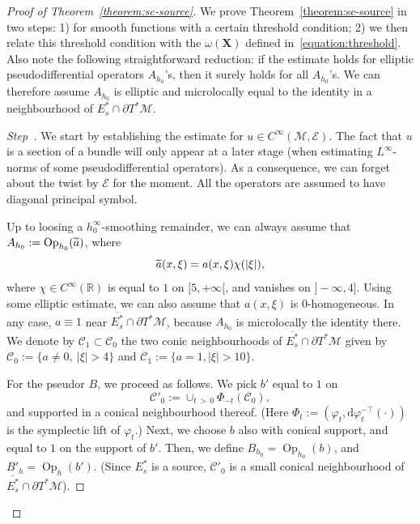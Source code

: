 \documentclass[10pt]{amsart}
\theoremstyle{definition}\newtheorem{defi}[theo]{Definition}\newtheorem{rema}[theo]{Remark}\newtheorem{exam}[theo]{Example}\newtheorem{exem}[theo]{Example}\newtheorem{nota}[theo]{Notation}
\newcommand{\R}{\mathbb{R}}
\newcommand{\X}{\mathbf{X}}
\newcommand{\M}{\mathcal{M}}
\newcommand{\E}{\mathcal{E}}
\newcommand{\clC}{\mathcal{C}}
\newcommand{\dd}{\mathrm{d}}
\DeclareMathOperator{\Op}{Op}
\newcounter{stepcount}
\newenvironment{step}{\refstepcounter{stepcount}\begin{proof}[Step~\thestepcount]}{\let\qed\relax\end{proof}}
\let\oldtilde\tilde
\renewcommand*{\tilde}[1]{\mathchoice{\widetilde{#1}}{\widetilde{#1}}{\oldtilde{#1}}{\oldtilde{#1}}}
\begin{document}
\begin{proof}[Proof of Theorem~\ref{theorem:sc-source}] We prove Theorem~\ref{theorem:sc-source} in two steps: 1) for smooth functions with a certain threshold condition; 2) we then relate this threshold condition with the $\omega(\X)$ defined in~\eqref{equation:threshold}. Also note the following straightforward reduction: if the estimate holds for elliptic pseudodifferential operators $A_{h_0}$'s, then it surely holds for all $A_{h_0}$'s. We can therefore assume $A_{h_0}$ is elliptic and microlocally equal to the identity in a neighbourhood of $E_s^* \cap \partial T^*\M$.

\begin{step}
We start by establishing the estimate for $u\in C^\infty(\M,\E)$. The fact that $u$ is a section of a bundle will only appear at a later stage (when estimating $L^\infty$-norms of some pseudodifferential operators). As a consequence, we can forget about the twist by $\E$ for the moment. All the operators are assumed to have diagonal principal symbol.

Up to loosing a $h_0^\infty$-smoothing remainder, we can always assume that $A_{h_0}:=\Op_{h_0}(\tilde{a})$, where
\[
\tilde{a}(x,\xi) = a(x,\xi) \chi(|\xi|),
\]
where $\chi\in C^\infty(\R)$ is equal to $1$ on $[5,+\infty[$, and vanishes on $]-\infty, 4]$. Using some elliptic estimate, we can also assume that $a(x,\xi)$ is $0$-homogeneous. In any case, $a \equiv 1$ near $\overline{E^*_s}\cap \partial T^*\M$, because $A_{h_0}$ is microlocally the identity there. We denote by $\clC_1 \subset \clC_0$ the two conic neighbourhoods of $\overline{E^\ast_s}\cap \partial T^\ast \M$ given by $\clC_0:=\{ a \neq 0,\ |\xi|>4\}$ and $\clC_1:=\{ a = 1,|\xi|>10\}$.

For the pseudor $B$, we proceed as follows. We pick $b'$ equal to $1$ on
\[
\clC'_0 := \cup_{t\,>\,0} \Phi_{-t}(\clC_0),
\]
and supported in a conical neighbourhood thereof. (Here $\Phi_t := (\varphi_t, \dd \varphi_t^{-\top}(\cdot))$ is the symplectic lift of $\varphi_t$.) Next, we choose $b$ also with conical support, and equal to $1$ on the support of $b'$. Then, we define $B_{h_0}= \Op_{h_0}(b)$, and $B'_h= \Op_h(b')$. (Since $E^\ast_s$ is a source, $\clC'_0$ is a small conical neighbourhood of $\overline{E^\ast_s}\cap \partial T^\ast \M$).


\end{step}
\end{proof}
\end{document}

